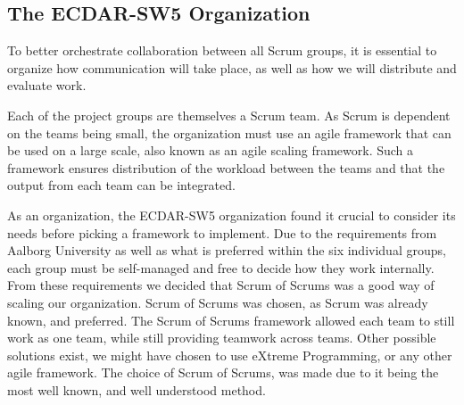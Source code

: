 \subsection{The ECDAR-SW5 Organization}\label{sub:ecdar-organization}
To better orchestrate collaboration between all Scrum groups, it is essential to organize how communication will take place, as well as how we will distribute and evaluate work.

Each of the project groups are themselves a Scrum team.
As Scrum is dependent on the teams being small, the organization must use an agile framework that can be used on a large scale, also known as an agile scaling framework.
Such a framework ensures distribution of the workload between the teams and that the output from each team can be integrated. 


As an organization, the ECDAR-SW5 organization found it crucial to consider its needs before picking a framework to implement.
Due to the requirements from Aalborg University as well as what is preferred within the six individual groups, each group must be self-managed and free to decide how they work internally.
From these requirements we decided that Scrum of Scrums was a good way of scaling our organization. Scrum of Scrums was chosen, as Scrum was already known, and preferred. The Scrum of Scrums framework allowed each team to still work as one team, while still providing teamwork across teams. Other possible solutions exist, we might have chosen to use eXtreme Programming, or any other agile framework. The choice of Scrum of Scrums, was made due to it being the most well known, and well understood method.

